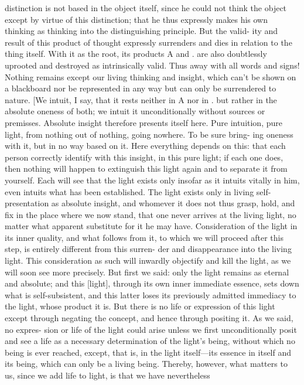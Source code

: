 distinction is not based in the object itself, since he could not think the
object except by virtue of this distinction; that he thus expressly makes his
own thinking as thinking into the distinguishing principle.
But the valid-
ity and result of this product of thought expressly surrenders and dies in
relation to the thing itself.
With it as the root, its products A and .
are also
doubtlessly uprooted and destroyed as intrinsically valid.
Thus away with
all words and signs! Nothing remains except our living thinking and
insight, which can’t be shown on a blackboard nor be represented in any
way but can only be surrendered to nature.
[We intuit, I say, that it rests neither in A nor in .
but rather in the
absolute oneness of both; we intuit it unconditionally without sources or
premisses.
Absolute insight therefore presents itself here.
Pure intuition,
pure light, from nothing out of nothing, going nowhere.
To be sure bring-
ing oneness with it, but in no way based on it.
Here everything depends on this: that each person correctly
identify with this insight, in this pure light; if each one does, then nothing
will happen to extinguish this light again and to separate it from yourself.
Each will see that the light exists only insofar as it intuits vitally in him,
even intuits what has been established.
The light exists only in living self-
presentation as absolute insight, and whomever it does not thus grasp,
hold, and fix in the place where we now stand, that one never arrives at the
living light, no matter what apparent substitute for it he may have.
Consideration of the light in its inner quality, and what follows from it, to
which we will proceed after this step, is entirely different from this surren-
der and disappearance into the living light.
This consideration as such will
inwardly objectify and kill the light, as we will soon see more precisely.
But
first we said: only the light remains as eternal and absolute; and this [light],
through its own inner immediate essence, sets down what is self-subsistent,
and this latter loses its previously admitted immediacy to the light, whose
product it is.
But there is no life or expression of this light except through
negating the concept, and hence through positing it.
As we said, no expres-
sion or life of the light could arise unless we first unconditionally posit and
see a life as a necessary determination of the light’s being, without which
no being is ever reached, except, that is, in the light itself—its essence in
itself and its being, which can only be a living being.
Thereby, however,
what matters to us, since we add life to light, is that we have nevertheless
